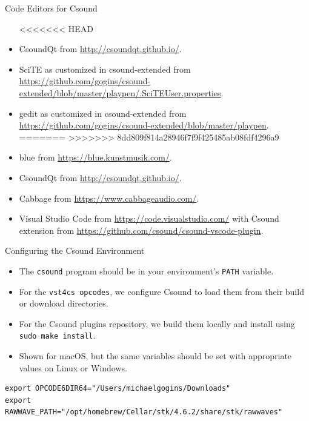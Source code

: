 \documentclass{beamer}
\begin{document}
    \begin{frame}{Code Editors for Csound}
        \begin{itemize}
<<<<<<< HEAD
            \item CsoundQt from \url{http://csoundqt.github.io/}.
            \item SciTE as customized in csound-extended from
            \url{https://github.com/gogins/csound-extended/blob/master/playpen/.SciTEUser.properties}.
            \item gedit as customized in csound-extended from
\url{https://github.com/gogins/csound-extended/blob/master/playpen}.
=======
>>>>>>> 8dd809f814a28946f7f9f425485ab08fdf4296a9
            \item blue from \url{https://blue.kunstmusik.com/}.
            \item CsoundQt from \url{http://csoundqt.github.io/}.
            \item Cabbage from \url{https://www.cabbageaudio.com/}.
            \item Visual Studio Code from \url{https://code.visualstudio.com/} with
            Csound extension from \url{https://github.com/csound/csound-vscode-plugin}.
        \end{itemize}
    \end{frame}
    
    \begin{frame}{Configuring the Csound Environment}
    	\begin{itemize}
		\item The \texttt{csound} program should be in your environment's \texttt{PATH} variable.
		\item For the \texttt{vst4cs opcodes}, we configure Csound to load them from their build or download directories.
		\item For the Csound plugins repository, we build them locally and install using \texttt{sudo make install}.
		\item Shown for macOS, but the same variables should be set with appropriate values on Linux or Windows.
	\end{itemize}
    \end{frame}    
    \begin{lstlisting}
export OPCODE6DIR64="/Users/michaelgogins/Downloads"
export RAWWAVE_PATH="/opt/homebrew/Cellar/stk/4.6.2/share/stk/rawwaves"
     \end{lstlisting}
    
\end{document}
